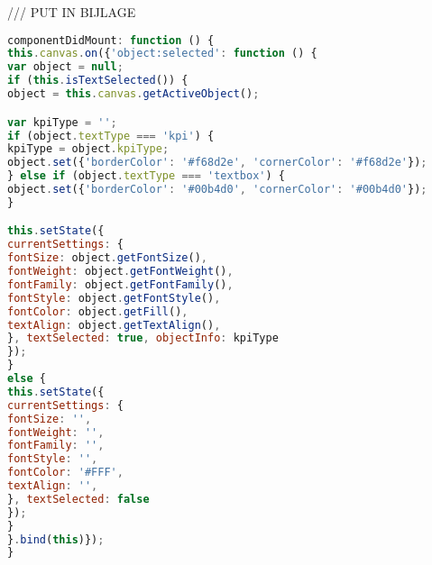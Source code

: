 /// PUT IN BIJLAGE
\begin{lstlisting}[language=javascript]
componentDidMount: function () {
this.canvas.on({'object:selected': function () {
var object = null;
if (this.isTextSelected()) {
object = this.canvas.getActiveObject();

var kpiType = '';
if (object.textType === 'kpi') {
kpiType = object.kpiType;
object.set({'borderColor': '#f68d2e', 'cornerColor': '#f68d2e'});
} else if (object.textType === 'textbox') {
object.set({'borderColor': '#00b4d0', 'cornerColor': '#00b4d0'});
}

this.setState({
currentSettings: {
fontSize: object.getFontSize(),
fontWeight: object.getFontWeight(),
fontFamily: object.getFontFamily(),
fontStyle: object.getFontStyle(),
fontColor: object.getFill(),
textAlign: object.getTextAlign(),
}, textSelected: true, objectInfo: kpiType
});
}
else {
this.setState({
currentSettings: {
fontSize: '',
fontWeight: '',
fontFamily: '',
fontStyle: '',
fontColor: '#FFF',
textAlign: '',
}, textSelected: false
});
}
}.bind(this)});
}
\end{lstlisting}


\fi